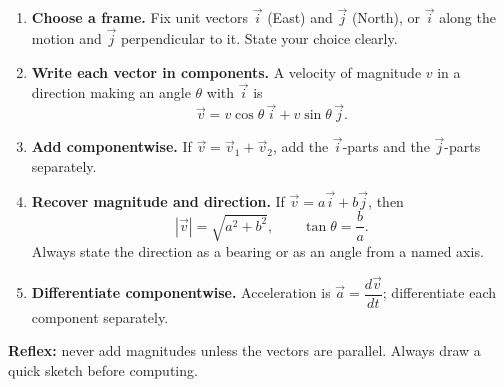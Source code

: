 \documentclass[11pt]{article}
\begin{document}
\begin{methode}
\begin{enumerate}
\item \textbf{Choose a frame.} Fix unit vectors $\vec{i}$ (East) and $\vec{j}$ (North), or $\vec{i}$ along the motion and $\vec{j}$ perpendicular to it. State your choice clearly.
\item \textbf{Write each vector in components.} A velocity of magnitude $v$ in a direction making an angle $\theta$ with $\vec{i}$ is
\[ \vec{v} = v\cos\theta\,\vec{i} + v\sin\theta\,\vec{j}. \]
\item \textbf{Add componentwise.} If $\vec{v} = \vec{v}_1 + \vec{v}_2$, add the $\vec{i}$-parts and the $\vec{j}$-parts separately.
\item \textbf{Recover magnitude and direction.} If $\vec{v} = a\vec{i} + b\vec{j}$, then
\[ |\vec{v}| = \sqrt{a^2+b^2}, \qquad \tan\theta = \frac{b}{a}. \]
Always state the direction as a bearing or as an angle from a named axis.
\item \textbf{Differentiate componentwise.} Acceleration is $\vec{a} = \dfrac{d\vec{v}}{dt}$; differentiate each component separately.
\end{enumerate}
\textbf{Reflex:} never add magnitudes unless the vectors are parallel. Always draw a quick sketch before computing.
\end{methode}
\end{document}
